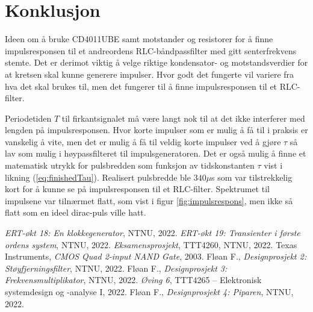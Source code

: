 \documentclass[a4paper,11pt,norsk]{article}
\begin{document}
\section{Konklusjon}
\label{sec:konklusjon}
Ideen om å bruke CD4011UBE samt motstander og resistorer for å finne impulsresponsen til et andreordens RLC-båndpassfilter med gitt senterfrekvens stemte. Det er derimot viktig å velge riktige kondensator- og motstandsverdier for at kretsen skal kunne generere impulser. Hvor godt det fungerte vil variere fra hva det skal brukes til, men det fungerer til å finne impulsresponsen til et RLC-filter. 

Periodetiden $T$ til firkantsignalet må være langt nok til at det ikke interferer med lengden på impulsresponsen. 
Hvor korte impulser som er mulig å få til i praksis er vanskelig å vite, men det er mulig å få til veldig korte impulser ved å gjøre $\tau$ så lav som mulig i høypassfilteret til impulsgeneratoren. 
Det er også mulig å finne et matematisk utrykk for pulsbredden som funksjon av tidskonstanten $\tau$ vist i likning (\ref{eq:finishedTau}). Realisert pulsbredde ble $340\mu$s som var tilstrekkelig kort for å kunne se på impulsresponsen til et RLC-filter.
Spektrumet til impulsene var tilnærmet flatt, som vist i figur \ref{fig:impulsrespons}, men ikke så flatt som en ideel dirac-puls ville hatt.  

{}

\begin{thebibliography}{99}
        \textit{ERT-økt 18: En klokkegenerator}, 
    	NTNU,
    	2022.
        \textit{ERT-økt 19: Transienter i første ordens system}, 
    	NTNU,
    	2022.
        \textit{Eksamensprosjekt}, 
    	TTT4260, NTNU,
    	2022.
        Texas Instruments, 
        \textit{CMOS Quad 2-input NAND Gate}, 
    	2003.
        Fløan F., 
        \textit{Designprosjekt 2: Støyfjerningsfilter}, 
    	NTNU,
    	2022.
        Fløan F., 
        \textit{Designprosjekt 3: Frekvensmultiplikator}, 
    	NTNU,
    	2022.
        \textit{Øving 6}, 
    	TTT4265 – Elektronisk systemdesign og -analyse I,
    	2022.
        Fløan F., 
        \textit{Designprosjekt 4: Piparen}, 
    	NTNU,
    	2022.
\end{thebibliography}
\end{document}
